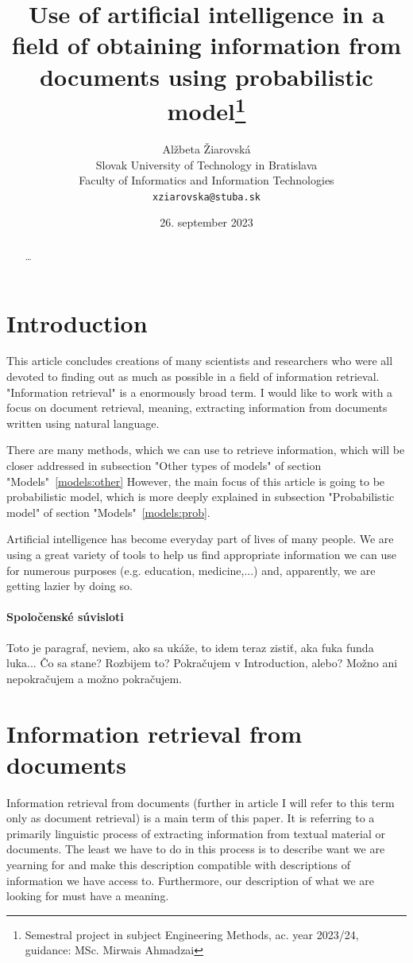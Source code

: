 \documentclass[10pt ,english,a4paper]{article}
\title{Use of artificial intelligence in a field of obtaining information from documents using probabilistic model\thanks{Semestral project in subject Engineering Methods, ac. year 2023/24, guidance: MSc. Mirwais Ahmadzai}}
\author{Alžbeta Žiarovská\\[2pt]
	{\small Slovak University of Technology in Bratislava}\\
	{\small Faculty of Informatics and Information Technologies}\\
	{\small \texttt{xziarovska@stuba.sk}}
	}
\date{\small 26. september 2023}
\begin{document}
\maketitle
\newpage

\begin{abstract}
\ldots
\end{abstract}
\newpage

\section{Introduction}

This article concludes creations of many scientists and researchers who were all devoted to finding out as much as possible in a field of information retrieval. "Information retrieval" is a enormously broad term. I would like to work with a focus on document retrieval, meaning, extracting information from documents written using natural language. 

There are many methods, which we can use to retrieve information, which will be closer addressed in subsection "Other types of models" of section "Models"~\ref{models:other} However, the main focus of this article is going to be probabilistic model, which is more deeply explained in subsection "Probabilistic model" of section "Models"~\ref{models:prob}.

Artificial intelligence has become everyday part of lives of many people. We are using a great variety of tools to help us find appropriate information we can use for numerous purposes (e.g. education, medicine,...) and, apparently, we are getting lazier by doing so. \cite{ahmad23impact}
	

\paragraph{Spoločenské súvisloti}

Toto je paragraf, neviem, ako sa ukáže, to idem teraz zistiť, aka fuka funda luka... Čo sa stane? Rozbijem to?
Pokračujem v Introduction, alebo? Možno ani nepokračujem \cite{jones99info}a možno pokračujem.

\section{Information retrieval from documents}\label{ir}

Information retrieval from documents (further in article I will refer to this term only as document retrieval) is a main term of this paper. It is referring to a primarily linguistic process of extracting information from textual material or documents. The least we have to do in this process is to describe want we are yearning for and make this description compatible with descriptions of information we have access to. Furthermore, our description of what we are looking for must have a meaning. \cite{blair03info}
\end{document}
